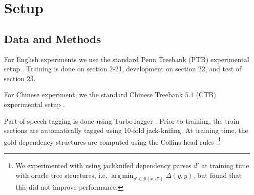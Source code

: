 \documentclass[11pt,letterpaper]{article}
\DeclareMathOperator*{\argmin}{arg\,min}
\begin{document}






















\section{Setup}


\subsection{Data and Methods}

For English experiments we use the standard Penn Treebank (PTB)
experimental setup \cite{marcus1993building}. Training is done on
section 2-21, development on section 22, and test of section 23.

For Chinese experiment, we the standard Chinese Treebank 5.1 (CTB)
experimental setup \cite{xue2005penn}.

Part-of-speech tagging is done using TurboTagger
\cite{martins2013turning}. Prior to training, the train sections are
automatically tagged using 10-fold jack-knifing. At training time, the
gold dependency structures are computed using the Collins head rules
\cite{collins2003head}.\footnote{ We experimented with using
  jackknifed dependency parses $d'$ at training time with oracle tree
  structures, i.e. $\argmin_{y' \in \mathcal{Y}(x, d')} \Delta(y, y)$,
  but found that this did not improve performance.}
\end{document}
